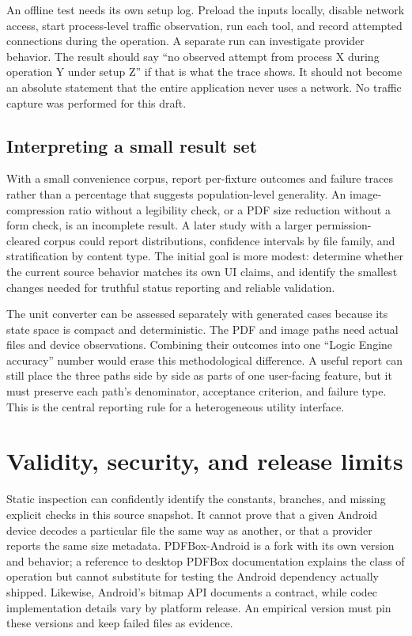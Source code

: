\documentclass[10pt,letterpaper]{article}
\begin{document}
An offline test needs its own setup log. Preload the inputs locally, disable network access, start process-level traffic observation, run each tool, and record attempted connections during the operation. A separate run can investigate provider behavior. The result should say ``no observed attempt from process X during operation Y under setup Z'' if that is what the trace shows. It should not become an absolute statement that the entire application never uses a network. No traffic capture was performed for this draft.

\subsection{Interpreting a small result set}

With a small convenience corpus, report per-fixture outcomes and failure traces rather than a percentage that suggests population-level generality. An image-compression ratio without a legibility check, or a PDF size reduction without a form check, is an incomplete result. A later study with a larger permission-cleared corpus could report distributions, confidence intervals by file family, and stratification by content type. The initial goal is more modest: determine whether the current source behavior matches its own UI claims, and identify the smallest changes needed for truthful status reporting and reliable validation.

The unit converter can be assessed separately with generated cases because its state space is compact and deterministic. The PDF and image paths need actual files and device observations. Combining their outcomes into one ``Logic Engine accuracy'' number would erase this methodological difference. A useful report can still place the three paths side by side as parts of one user-facing feature, but it must preserve each path's denominator, acceptance criterion, and failure type. This is the central reporting rule for a heterogeneous utility interface.

\section{Validity, security, and release limits}

Static inspection can confidently identify the constants, branches, and missing explicit checks in this source snapshot. It cannot prove that a given Android device decodes a particular file the same way as another, or that a provider reports the same size metadata. PDFBox-Android is a fork with its own version and behavior; a reference to desktop PDFBox documentation explains the class of operation but cannot substitute for testing the Android dependency actually shipped. Likewise, Android's bitmap API documents a contract, while codec implementation details vary by platform release. An empirical version must pin these versions and keep failed files as evidence.
\end{document}
